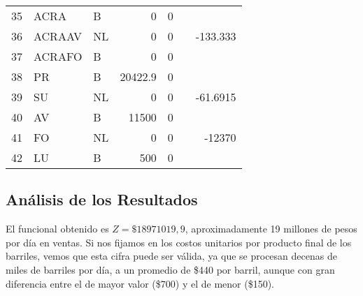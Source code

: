 \documentclass[a4paper,10pt]{article}
\begin{document}
\begin{center}
\begin{tabular}{| l  l  l  r  r  c  r |}
     35 &   ACRA &           B &                0 &               0 &                &		\\                
     36 &   ACRAAV &         NL &               0 &               0 &                &      -133.333 \\ 
     37 &   ACRAFO &         B &                0 &               0 &                &		\\ \hline               
     38 &   PR &             B &          20422.9 &               0 &                &		\\                
     39 &   SU &             NL &               0 &               0 &                &      -61.6915 \\ 
     40 &   AV &             B &            11500 &               0 &                &		\\                
     41 &   FO &             NL &               0 &               0 &                &        -12370 \\ 
     42 &   LU &             B &              500 &               0 &                &		\\                
\hline
       \end{tabular}
\end{center}

\newpage
\subsection{An\'alisis de los Resultados}

El funcional obtenido es $Z = \$18971019,9$, aproximadamente 19 millones de pesos por d\'ia en ventas. Si nos fijamos en los costos unitarios por producto final de los barriles, vemos que esta cifra puede ser v\'alida, ya que se procesan decenas de miles de barriles por d\'ia, a un promedio de \$440 por barril, aunque con gran diferencia entre el de mayor valor (\$700) y el de menor (\$150).
\\
\end{document}
